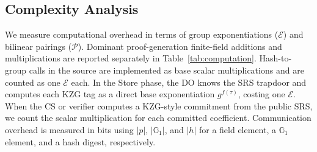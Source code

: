 \documentclass[lettersize,journal]{IEEEtran}
\newcommand{\GG}{\mathbb{G}}
\newcommand{\CompExp}{\mathcal{E}}
\newcommand{\CompPair}{\mathcal{P}}
\begin{document}
\subsection{Complexity Analysis}
\label{sec:complexity_analysis}
We measure computational overhead in terms of group exponentiations ($\CompExp$) and bilinear pairings ($\CompPair$). 
Dominant proof-generation finite-field additions and multiplications are reported separately in Table~\ref{tab:computation}. Hash-to-group calls in the source are implemented as base scalar multiplications and are counted as one $\CompExp$ each. In the \textsf{Store} phase, the DO knows the SRS trapdoor and computes each KZG tag as a direct base exponentiation \(g^{f(\tau)}\), costing one \(\CompExp\). When the CS or verifier computes a KZG-style commitment from the public SRS, we count the scalar multiplication for each committed coefficient. Communication overhead is measured in bits using $|p|$, $|\GG_1|$, and $|h|$ for a field element, a $\GG_1$ element, and a hash digest, respectively.
\end{document}
